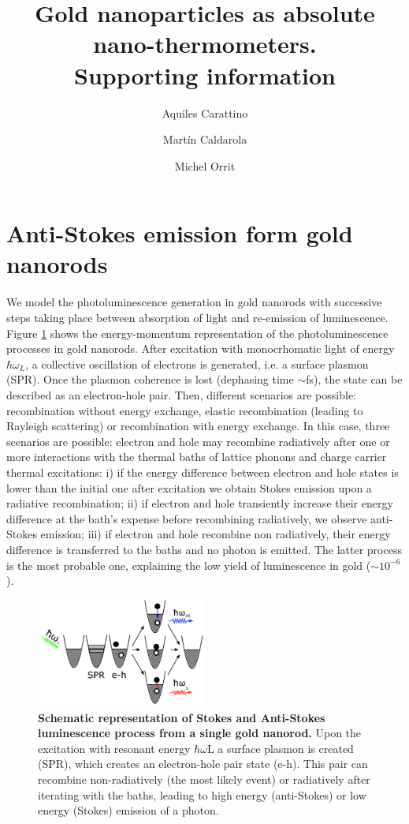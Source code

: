 \documentclass[journal=nalefd,manuscript=letter]{achemso}
\author{Aquiles Carattino}
\affiliation[Leiden]
{Huygens-Kamerlingh Onnes Lab, 2300RA Leiden, The Netherlands}
\author{Mart\'in Caldarola}
\affiliation[Leiden]
{Huygens-Kamerlingh Onnes Lab, 2300RA Leiden, The Netherlands}
\author{Michel Orrit}
\affiliation[Leiden]
{Huygens-Kamerlingh Onnes Lab, 2300RA Leiden, The Netherlands}
\title{Gold nanoparticles as absolute nano-thermometers. \\
Supporting information}
\begin{document}
\maketitle


\section{Anti-Stokes emission form gold nanorods}\label{sec:AS}

We model the photoluminescence generation in gold nanorods with successive 
steps taking place between absorption of light and re-emission of luminescence\cite{Carattino2016a}. 
Figure \ref{fig:anti-Stokes-process} shows the energy-momentum representation
of the photoluminescence processes in gold nanorods. 
After excitation with monocrhomatic light of energy $\hbar \omega_L$, 
a collective oscillation of electrons is generated, i.e. a surface plasmon (SPR). 
Once the plasmon coherence is lost (dephasing time $\sim$fs), the state can be described as an
electron-hole pair. Then, different scenarios are possible: recombination 
without energy exchange, elastic recombination (leading to Rayleigh scattering) or 
recombination with energy exchange. In this case, three scenarios are possible: electron and hole may
recombine radiatively after one or more interactions with the thermal baths of
lattice phonons and charge carrier thermal excitations: i) if the energy
difference between electron and hole states is lower than the initial one after
excitation we obtain Stokes emission upon a radiative recombination; ii) if
electron and hole transiently increase their energy difference at the bath's
expense before recombining radiatively, we observe anti-Stokes emission; iii) if
electron and hole recombine non radiatively, their energy difference is
transferred to the baths and no photon is emitted. The latter process is the
most probable one, explaining the low yield of luminescence in gold ($\sim 10^{-6}$). 

\begin{figure}[htp] \centering
\includegraphics[width=0.5\textwidth]{Figures/Supplementary/01_AS_Scheme/luminescence_all_AS.png}
\caption{\textbf{Schematic representation of Stokes and Anti-Stokes luminescence process from a single gold nanorod.} 
Upon the excitation with resonant energy $\hbar \omega\textrm{L}$ a surface plasmon is created (SPR), which creates 
an electron-hole pair state (e-h). This pair can recombine non-radiatively (the most likely event) or radiatively
after iterating with the baths, leading to high energy (anti-Stokes) or low energy (Stokes) emission of a photon.}
	\label{fig:anti-Stokes-process}
\end{figure}
\end{document}
